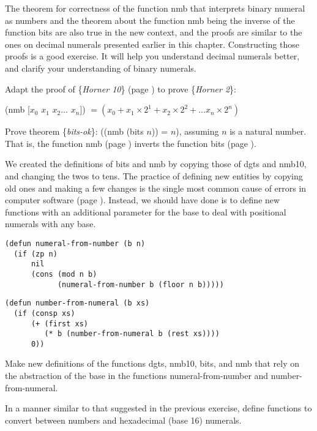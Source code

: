 The theorem for correctness of the function nmb that interprets
binary numeral as numbers and the theorem about the function nmb
being the inverse of the function bits are
also true in the new context, and the proofs are similar to the ones
on decimal numerals presented earlier in this chapter.
Constructing those proofs is a good exercise.
It will help you understand decimal numerals better,
and clarify your understanding of binary numerals.


\begin{ExerciseList}
\Exercise Adapt the proof of \{\emph{Horner 10}\} (page \pageref{horner10-thm})
to prove \{\emph{Horner 2}\}:


\begin{center}
\label{horner2-thm}
(nmb [$x_0$ $x_1$ $x_2 \dots$ $x_{n}$])
$= (x_0 + x_1 \times 2^1 + x_2 \times 2^2 + \dots x_{n} \times 2^{n})$
\end{center}

\Exercise \label{bits-ok}
Prove theorem \{\emph{bits-ok}\}: ((nmb (bits $n$)) = $n$), assuming $n$ is a natural number. \\
That is, the function nmb (page \pageref{nmb-defun})
inverts the function bits (page \pageref{bits-defun}).

\Exercise We created the definitions of bits and nmb
by copying those of dgts and nmb10, and changing the twos to tens.
The practice of defining new entities by copying
old ones and making a few changes is
the single most common cause of errors in computer software (page \pageref{abstraction}).
Instead, we should have done is to define new functions with
an additional parameter for the base to deal with positional
numerals with any base.
\label{numeral-from-number-defun}
\begin{Verbatim}
(defun numeral-from-number (b n)
  (if (zp n)
      nil
      (cons (mod n b)
            (numeral-from-number b (floor n b)))))
\end{Verbatim}
\label{number-from-numeral-defun}
\begin{Verbatim}
(defun number-from-numeral (b xs)
  (if (consp xs)
      (+ (first xs)
         (* b (number-from-numeral b (rest xs))))
      0))
\end{Verbatim}
Make new definitions of the functions dgts, nmb10, bits, and nmb
that rely on the abstraction of the base in
the functions numeral-from-number and number-from-numeral.

\Exercise In a manner similar to that suggested in the previous exercise,
       define functions to convert
       between numbers and hexadecimal (base 16) numerals.


\end{ExerciseList}
